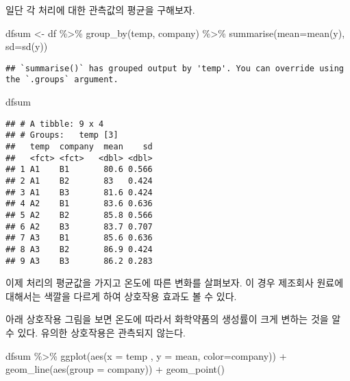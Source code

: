 \documentclass[
]{book}
\newenvironment{Shaded}{\begin{snugshade}}{\end{snugshade}}
\newcommand{\AttributeTok}[1]{\textcolor[rgb]{0.77,0.63,0.00}{#1}}
\newcommand{\FunctionTok}[1]{\textcolor[rgb]{0.00,0.00,0.00}{#1}}
\newcommand{\NormalTok}[1]{#1}
\newcommand{\OtherTok}[1]{\textcolor[rgb]{0.56,0.35,0.01}{#1}}
\newcommand{\SpecialCharTok}[1]{\textcolor[rgb]{0.00,0.00,0.00}{#1}}
\begin{document}
일단 각 처리에 대한 관측값의 평균을 구해보자.

\begin{Shaded}
\begin{Highlighting}[]
\NormalTok{dfsum }\OtherTok{\textless{}{-}}\NormalTok{ df }\SpecialCharTok{\%\textgreater{}\%} \FunctionTok{group\_by}\NormalTok{(temp, company)  }\SpecialCharTok{\%\textgreater{}\%}  \FunctionTok{summarise}\NormalTok{(}\AttributeTok{mean=}\FunctionTok{mean}\NormalTok{(y),  }\AttributeTok{sd=}\FunctionTok{sd}\NormalTok{(y))}
\end{Highlighting}
\end{Shaded}

\begin{verbatim}
## `summarise()` has grouped output by 'temp'. You can override using the `.groups` argument.
\end{verbatim}

\begin{Shaded}
\begin{Highlighting}[]
\NormalTok{dfsum}
\end{Highlighting}
\end{Shaded}

\begin{verbatim}
## # A tibble: 9 x 4
## # Groups:   temp [3]
##   temp  company  mean    sd
##   <fct> <fct>   <dbl> <dbl>
## 1 A1    B1       80.6 0.566
## 2 A1    B2       83   0.424
## 3 A1    B3       81.6 0.424
## 4 A2    B1       83.6 0.636
## 5 A2    B2       85.8 0.566
## 6 A2    B3       83.7 0.707
## 7 A3    B1       85.6 0.636
## 8 A3    B2       86.9 0.424
## 9 A3    B3       86.2 0.283
\end{verbatim}

이제 처리의 평균값을 가지고 온도에 따른 변화를 살펴보자. 이 경우 제조회사 원료에 대해서는 색깔을 다르게 하여 상호작용 효과도 볼 수 있다.

아래 상호작용 그림을 보면 온도에 따라서 화학약품의 생성률이 크게 변하는 것을 알 수 있다. 유의한 상호작용은 관측되지 않는다.

\begin{Shaded}
\begin{Highlighting}[]
\NormalTok{dfsum }\SpecialCharTok{\%\textgreater{}\%} 
  \FunctionTok{ggplot}\NormalTok{(}\FunctionTok{aes}\NormalTok{(}\AttributeTok{x =}\NormalTok{ temp  , }\AttributeTok{y =}\NormalTok{ mean,  }\AttributeTok{color=}\NormalTok{company)) }\SpecialCharTok{+}
   \FunctionTok{geom\_line}\NormalTok{(}\FunctionTok{aes}\NormalTok{(}\AttributeTok{group =}\NormalTok{ company)) }\SpecialCharTok{+}   \FunctionTok{geom\_point}\NormalTok{()}
\end{Highlighting}
\end{Shaded}
\end{document}
